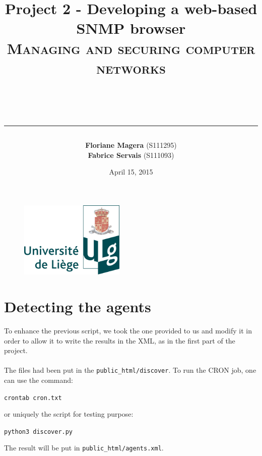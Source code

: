 \documentclass[a4paper,titlepage]{article}
\begin{document}
\begin{titlepage}

\begin{figure}
\centering
\includegraphics[width=5cm]{logo-ulg.png}
\end{figure}



\title{
\vspace{0.2cm}
\LARGE{\textbf{Project 2 - Developing a web-based SNMP browser }} \\ \textsc{Managing and securing computer networks}
\author{\textbf{Floriane Magera} \small{(S111295})\\\textbf{Fabrice Servais} \small{(S111093})}\\
\date{April 15, 2015}
\rule{15cm}{1.5pt}
}

\end{titlepage}

\pagestyle{fancy}

\maketitle

\section{Detecting the agents}
To enhance the previous script, we took the one provided to us and modify it in order to allow it to write the results in the XML, as in the first part of the project.

\paragraph{}

The files had been put in the \texttt{public\_html/discover}. To run the CRON job, one can use the command:
\begin{center}
	\texttt{crontab cron.txt}
\end{center}
or uniquely the script for testing purpose: 
\begin{center}
	\texttt{python3 discover.py}
\end{center}
The result will be put in \texttt{public\_html/agents.xml}.
\end{document}
